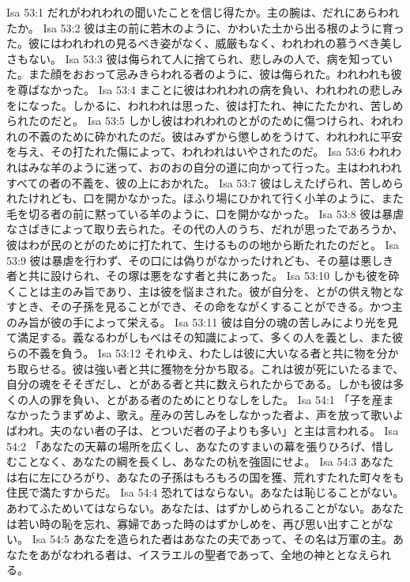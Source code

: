 Isa 53:1  だれがわれわれの聞いたことを信じ得たか。主の腕は、だれにあらわれたか。
Isa 53:2  彼は主の前に若木のように、かわいた土から出る根のように育った。彼にはわれわれの見るべき姿がなく、威厳もなく、われわれの慕うべき美しさもない。
Isa 53:3  彼は侮られて人に捨てられ、悲しみの人で、病を知っていた。また顔をおおって忌みきらわれる者のように、彼は侮られた。われわれも彼を尊ばなかった。
Isa 53:4  まことに彼はわれわれの病を負い、われわれの悲しみをになった。しかるに、われわれは思った、彼は打たれ、神にたたかれ、苦しめられたのだと。
Isa 53:5  しかし彼はわれわれのとがのために傷つけられ、われわれの不義のために砕かれたのだ。彼はみずから懲しめをうけて、われわれに平安を与え、その打たれた傷によって、われわれはいやされたのだ。
Isa 53:6  われわれはみな羊のように迷って、おのおの自分の道に向かって行った。主はわれわれすべての者の不義を、彼の上におかれた。
Isa 53:7  彼はしえたげられ、苦しめられたけれども、口を開かなかった。ほふり場にひかれて行く小羊のように、また毛を切る者の前に黙っている羊のように、口を開かなかった。
Isa 53:8  彼は暴虐なさばきによって取り去られた。その代の人のうち、だれが思ったであろうか、彼はわが民のとがのために打たれて、生けるものの地から断たれたのだと。
Isa 53:9  彼は暴虐を行わず、その口には偽りがなかったけれども、その墓は悪しき者と共に設けられ、その塚は悪をなす者と共にあった。
Isa 53:10  しかも彼を砕くことは主のみ旨であり、主は彼を悩まされた。彼が自分を、とがの供え物となすとき、その子孫を見ることができ、その命をながくすることができる。かつ主のみ旨が彼の手によって栄える。
Isa 53:11  彼は自分の魂の苦しみにより光を見て満足する。義なるわがしもべはその知識によって、多くの人を義とし、また彼らの不義を負う。
Isa 53:12  それゆえ、わたしは彼に大いなる者と共に物を分かち取らせる。彼は強い者と共に獲物を分かち取る。これは彼が死にいたるまで、自分の魂をそそぎだし、とがある者と共に数えられたからである。しかも彼は多くの人の罪を負い、とがある者のためにとりなしをした。
Isa 54:1  「子を産まなかったうまずめよ、歌え。産みの苦しみをしなかった者よ、声を放って歌いよばわれ。夫のない者の子は、とついだ者の子よりも多い」と主は言われる。
Isa 54:2  「あなたの天幕の場所を広くし、あなたのすまいの幕を張りひろげ、惜しむことなく、あなたの綱を長くし、あなたの杭を強固にせよ。
Isa 54:3  あなたは右に左にひろがり、あなたの子孫はもろもろの国を獲、荒れすたれた町々をも住民で満たすからだ。
Isa 54:4  恐れてはならない。あなたは恥じることがない。あわてふためいてはならない。あなたは、はずかしめられることがない。あなたは若い時の恥を忘れ、寡婦であった時のはずかしめを、再び思い出すことがない。
Isa 54:5  あなたを造られた者はあなたの夫であって、その名は万軍の主。あなたをあがなわれる者は、イスラエルの聖者であって、全地の神ととなえられる。
